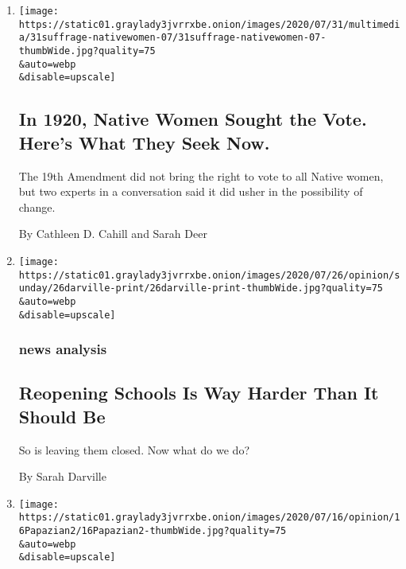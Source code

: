 \begin{enumerate}
\def\labelenumi{\arabic{enumi}.}
\item
  \href{/2020/07/31/style/19th-amendment-native-womens-suffrage.html}{}

  \texttt{[image: https://static01.graylady3jvrrxbe.onion/images/2020/07/31/multimedia/31suffrage-nativewomen-07/31suffrage-nativewomen-07-thumbWide.jpg?quality=75\\\&auto=webp\\\&disable=upscale]}

  \hypertarget{in-1920-native-women-sought-the-vote-heres-what-they-seek-now}{%
  \subsection{In 1920, Native Women Sought the Vote. Here's What They
  Seek
  Now.}\label{in-1920-native-women-sought-the-vote-heres-what-they-seek-now}}

  The 19th Amendment did not bring the right to vote to all Native
  women, but two experts in a conversation said it did usher in the
  possibility of change.

  By Cathleen D. Cahill and Sarah Deer
\item
  \href{/2020/07/23/sunday-review/reopening-schools-coronavirus.html}{}

  \texttt{[image: https://static01.graylady3jvrrxbe.onion/images/2020/07/26/opinion/sunday/26darville-print/26darville-print-thumbWide.jpg?quality=75\\\&auto=webp\\\&disable=upscale]}

  \hypertarget{news-analysis}{%
  \subsubsection{news analysis}\label{news-analysis}}

  \hypertarget{reopening-schools-is-way-harder-than-it-should-be}{%
  \subsection{Reopening Schools Is Way Harder Than It Should
  Be}\label{reopening-schools-is-way-harder-than-it-should-be}}

  So is leaving them closed. Now what do we do?

  By Sarah Darville
\item
  \href{/2020/07/16/opinion/culture/mashrou-leila-fan-suicide.html}{}

  \texttt{[image: https://static01.graylady3jvrrxbe.onion/images/2020/07/16/opinion/16Papazian2/16Papazian2-thumbWide.jpg?quality=75\\\&auto=webp\\\&disable=upscale]}


\end{enumerate}
